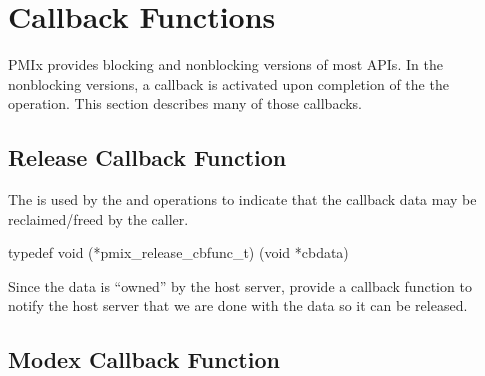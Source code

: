 %

%

%


\section{Callback Functions}

PMIx provides blocking and nonblocking versions of most APIs.
In the nonblocking versions, a callback is activated upon completion of the the operation.
This section describes many of those callbacks.


\subsection{Release Callback Function}

\summary

The  is used by the  and  operations to indicate that the callback data may be reclaimed/freed by the caller.

\format

\cspecificstart
\begin{codepar}
typedef void (*pmix_release_cbfunc_t)
    (void *cbdata)
\end{codepar}
\cspecificend

\begin{arglist}
\end{arglist}

\descr

Since the data is ``owned'' by the host server, provide a callback function to notify the host server that we are done with the data so it can be released.


\subsection{Modex Callback Function}

